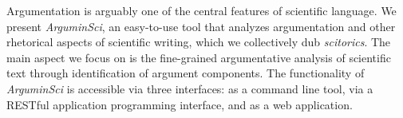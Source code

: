 Argumentation is arguably one of the central features of scientific language. We present \emph{ArguminSci}, an easy-to-use tool that analyzes argumentation and other rhetorical aspects of scientific writing, which we collectively dub \emph{scitorics}. The main aspect we focus on is the fine-grained argumentative analysis of scientific text through identification of argument components. The functionality of \emph{ArguminSci} is accessible via three interfaces: as a command line tool, via a RESTful application programming interface, and as a web application.

